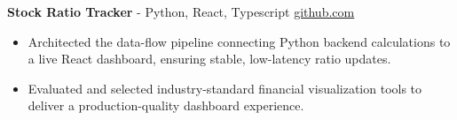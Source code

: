\documentclass[11pt]{article}       %
\begin{document}

\textbf{Stock Ratio Tracker}{ - Python, React, Typescript} \hfill \href{https://github.com/Monica20030707/tradingDashboard-UI}{github.com} \\
\vspace{-9pt}
\begin{itemize}
  \item Architected the data-flow pipeline connecting Python backend calculations to a live React dashboard, ensuring stable, low-latency ratio updates. 
  \item Evaluated and selected industry-standard financial visualization tools to deliver a production-quality dashboard experience.
\end{itemize}

\end{document}
